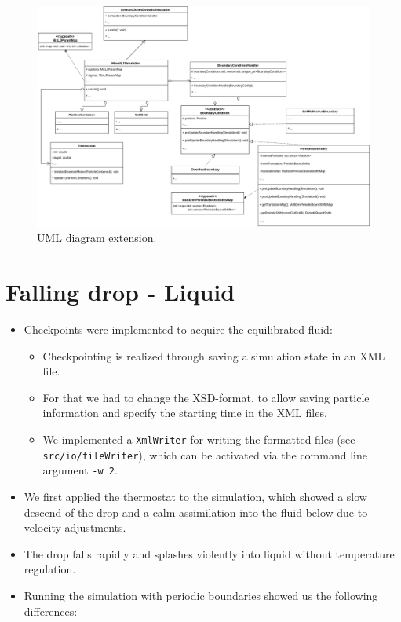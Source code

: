 \documentclass{article}
\begin{document}
\begin{figure}[H]
    \includegraphics[width=1.25\textwidth]{res/UML4v2.drawio}
    \caption{UML diagram extension.}
    \label{fig:uml}
\end{figure}

\section{Falling drop - Liquid}
\label{sec:drop}

    \begin{itemize}
        \item Checkpoints were implemented to acquire the equilibrated fluid:
        \begin{itemize}
            \item Checkpointing is realized through saving a simulation state in an XML file.
            \item For that we had to change the XSD-format, to allow saving particle information and specify the starting time in the XML files.
            \item We implemented a \texttt{XmlWriter} for writing the formatted files (see \texttt{src/io/fileWriter}), which can be activated via the command line argument \texttt{-w 2}.
        \end{itemize}
        \item We first applied the thermostat to the simulation, which showed a slow descend of the drop and a calm assimilation into the fluid below due to velocity adjustments.
        \item The drop falls rapidly and splashes violently into liquid without temperature regulation.
        \item Running the simulation with periodic boundaries showed us the following differences:
    \end{itemize}
\end{document}
